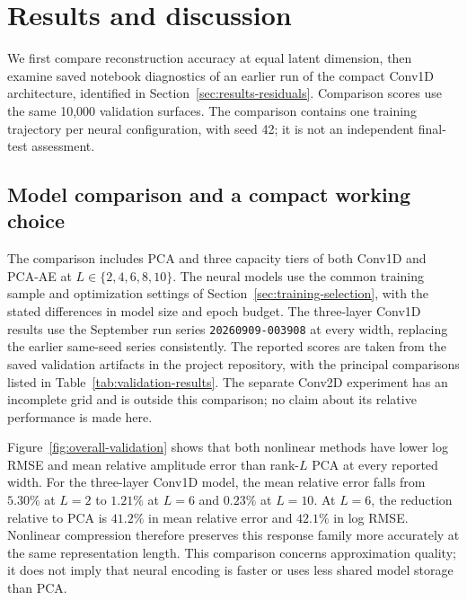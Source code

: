 \section{Results and discussion}
\label{sec:results}

We first compare reconstruction accuracy at equal latent dimension, then
examine saved notebook diagnostics of an earlier run of the compact
Conv1D architecture, identified in Section~\ref{sec:results-residuals}.
Comparison scores use the same 10,000 validation surfaces. The comparison
contains one training trajectory per neural configuration, with seed 42;
it is not an independent final-test assessment.

\subsection{Model comparison and a compact working choice}
\label{sec:results-comparison}

The comparison includes PCA and three capacity tiers of both Conv1D and
PCA-AE at $L\in\{2,4,6,8,10\}$. The neural models use the common training
sample and optimization settings of Section~\ref{sec:training-selection},
with the stated differences in model size and epoch budget. The three-layer
Conv1D results use the September run series
\texttt{20260909-003908} at every width, replacing the earlier same-seed
series consistently. The reported scores are taken from the saved
validation artifacts in the project repository, with the principal
comparisons listed in Table~\ref{tab:validation-results}.
The separate Conv2D experiment has an incomplete grid and is outside this
comparison; no claim about its relative performance is made here.

Figure~\ref{fig:overall-validation} shows that both nonlinear methods have
lower log RMSE and mean relative amplitude error than rank-$L$ PCA at every
reported width. For the three-layer Conv1D model, the mean relative error
falls from $5.30\%$ at $L=2$ to $1.21\%$ at $L=6$ and $0.23\%$ at
$L=10$. At $L=6$, the reduction relative to PCA is $41.2\%$ in mean
relative error and $42.1\%$ in log RMSE. Nonlinear compression therefore
preserves this response family more accurately at the same representation
length. This comparison concerns approximation quality; it does not imply
that neural encoding is faster or uses less shared model storage than PCA.

